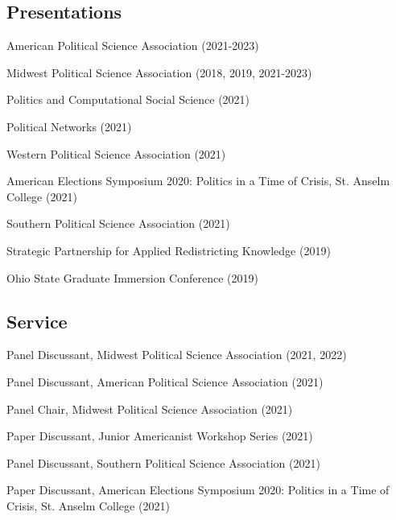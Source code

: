 \documentclass[letterpaper]{article}
\renewenvironment{itemize}{
  \begin{list}{}{
    \setlength{\leftmargin}{1.5em}
  }
}{
  \end{list}
}
\begin{document}
\subsection*{Presentations}
\begin{itemize}

\item American Political Science Association (2021-2023)

\item Midwest Political Science Association (2018, 2019, 2021-2023)

\item Politics and Computational Social Science (2021)

\item Political Networks (2021)

\item Western Political Science Association (2021)

\item American Elections Symposium 2020: Politics in a Time of Crisis, St. Anselm College (2021)

\item Southern Political Science Association (2021)

\item Strategic Partnership for Applied Redistricting Knowledge (2019)

\item Ohio State Graduate Immersion Conference (2019)
\end{itemize}

\subsection*{Service}
\begin{itemize}

\item Panel Discussant, Midwest Political Science Association (2021, 2022)

\item Panel Discussant, American Political Science Association (2021)

\item Panel Chair, Midwest Political Science Association (2021)

\item Paper Discussant, Junior Americanist Workshop Series (2021)

\item Panel Discussant, Southern Political Science Association (2021)

\item Paper Discussant, American Elections Symposium 2020: Politics in a Time of Crisis, St. Anselm College (2021)

\end{itemize}
\end{document}
